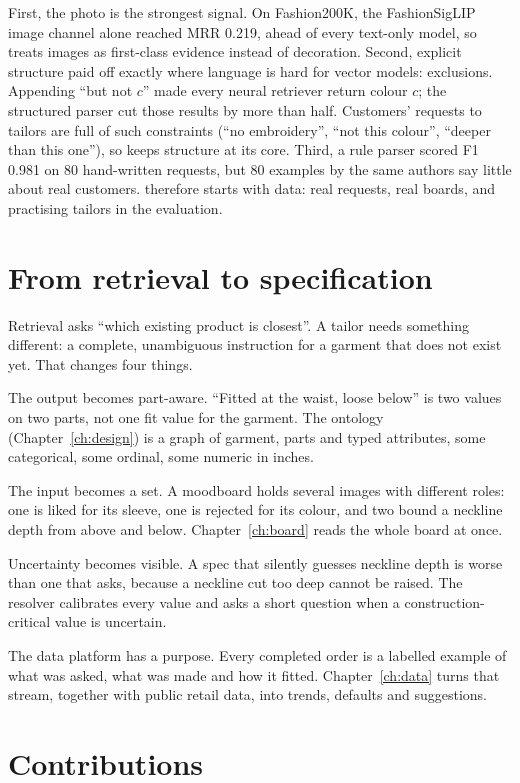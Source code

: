 First, the photo is the strongest signal. On Fashion200K, the FashionSigLIP image channel alone reached MRR 0.219, ahead of every text-only model, so \sys{} treats images as first-class evidence instead of decoration. Second, explicit structure paid off exactly where language is hard for vector models: exclusions. Appending ``but not $c$'' made every neural retriever return colour $c$; the structured parser cut those results by more than half. Customers' requests to tailors are full of such constraints (``no embroidery'', ``not this colour'', ``deeper than this one''), so \sys{} keeps structure at its core. Third, a rule parser scored F1 0.981 on 80 hand-written requests, but 80 examples by the same authors say little about real customers. \sys{} therefore starts with data: real requests, real boards, and practising tailors in the evaluation.

\section{From retrieval to specification}

Retrieval asks ``which existing product is closest''. A tailor needs something different: a complete, unambiguous instruction for a garment that does not exist yet. That changes four things.

The output becomes part-aware. ``Fitted at the waist, loose below'' is two values on two parts, not one fit value for the garment. The ontology (Chapter~\ref{ch:design}) is a graph of garment, parts and typed attributes, some categorical, some ordinal, some numeric in inches.

The input becomes a set. A moodboard holds several images with different roles: one is liked for its sleeve, one is rejected for its colour, and two bound a neckline depth from above and below. Chapter~\ref{ch:board} reads the whole board at once.

Uncertainty becomes visible. A spec that silently guesses neckline depth is worse than one that asks, because a neckline cut too deep cannot be raised. The resolver calibrates every value and asks a short question when a construction-critical value is uncertain.

The data platform has a purpose. Every completed order is a labelled example of what was asked, what was made and how it fitted. Chapter~\ref{ch:data} turns that stream, together with public retail data, into trends, defaults and suggestions.

\section{Contributions}

